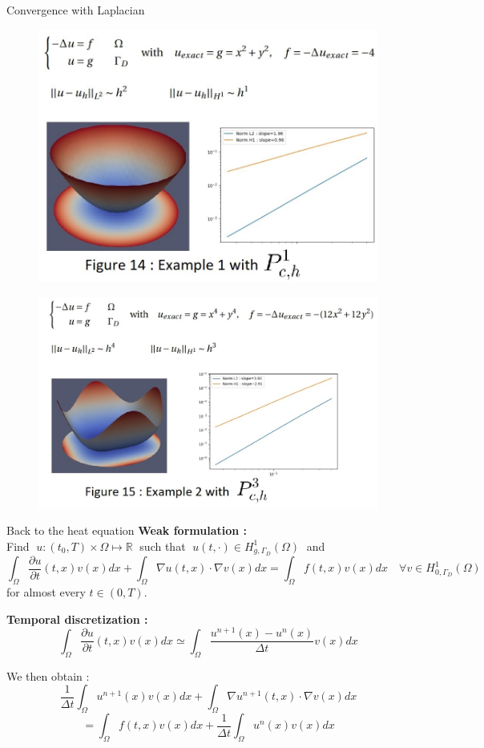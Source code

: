 \begin{frame}[allowframebreaks]{Convergence with Laplacian}
	\begin{figure}
		\centering
		\includegraphics[width=0.7\linewidth]{"images/parareal/convergence_laplace.jpg"}
	\end{figure}

	\newpage
	
	\begin{figure}
		\centering
		\includegraphics[width=0.8\linewidth]{"images/parareal/convergence_laplace_2.jpg"}
	\end{figure}
\end{frame}

\begin{frame}{Back to the heat equation}
	\textbf{Weak formulation :} \\
	Find $\; u:(t_0,T)\times\Omega \mapsto \mathbb{R} \;$ such that $\; u(t,\cdot)\in H_{g,\Gamma_D}^1(\Omega) \;$ and
	$$\boxed{\int_\Omega \frac{\partial u}{\partial t}(t,x)v(x)dx}+\int_\Omega \nabla u(t,x)\cdot\nabla v(x)dx = \int_\Omega f(t,x)v(x)dx \quad \forall v\in H_{0,\Gamma_D}^1(\Omega)$$
	for almost every $t\in(0,T)$.
	
	\textbf{Temporal discretization :}
	$$\int_\Omega \frac{\partial u}{\partial t}(t,x)v(x)dx \simeq \int_\Omega \frac{u^{n+1}(x)-u^n(x)}{\Delta t}v(x)dx$$
	
	We then obtain :
	$$\frac{1}{\Delta t}\int_\Omega u^{n+1}(x)v(x)dx+\int_\Omega \nabla u^{n+1}(t,x)\cdot\nabla v(x)dx$$
	$$=\int_\Omega f(t,x)v(x)dx + \frac{1}{\Delta t}\int_\Omega u^n(x)v(x)dx$$
\end{frame}

